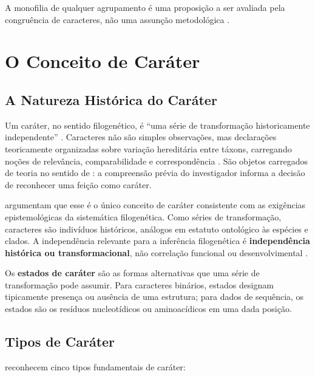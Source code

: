 A monofilia de qualquer agrupamento é uma proposição a ser avaliada pela congruência de caracteres, não uma assunção metodológica \parencite{nixon1993}.

\section{O Conceito de Caráter}
\label{sec:caracteres}

\subsection{A Natureza Histórica do Caráter}

Um caráter, no sentido filogenético, é ``uma série de transformação historicamente independente'' \parencite[p.~333]{wheeleretal2006}. Caracteres não são simples observações, mas declarações teoricamente organizadas sobre variação hereditária entre táxons, carregando noções de relevância, comparabilidade e correspondência \parencite{wheeler2012}. São objetos carregados de teoria no sentido de \textcite{popper1959}: a compreensão prévia do investigador informa a decisão de reconhecer uma feição como caráter.

\textcite{grant2004ts} argumentam que esse é o único conceito de caráter consistente com as exigências epistemológicas da sistemática filogenética. Como séries de transformação, caracteres são indivíduos históricos, análogos em estatuto ontológico às espécies e clados. A independência relevante para a inferência filogenética é \textbf{independência histórica ou transformacional}, não correlação funcional ou desenvolvimental \parencite{grant2004ts}.

Os \textbf{estados de caráter} são as formas alternativas que uma série de transformação pode assumir. Para caracteres binários, estados designam tipicamente presença ou ausência de uma estrutura; para dados de sequência, os estados são os resíduos nucleotídicos ou aminoacídicos em uma dada posição.

\subsection{Tipos de Caráter}

\textcite{wheeleretal2006} reconhecem cinco tipos fundamentais de caráter:

